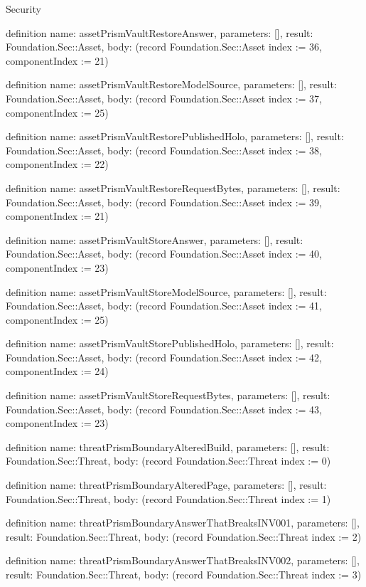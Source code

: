 \begin{lexlean}{Security}
\begin{semanticmodule}
definition{
  name: assetPrismVaultRestoreAnswer,
  parameters: [],
  result: Foundation.Sec::Asset,
  body: (record Foundation.Sec::Asset {index := 36, componentIndex := 21})
}

definition{
  name: assetPrismVaultRestoreModelSource,
  parameters: [],
  result: Foundation.Sec::Asset,
  body: (record Foundation.Sec::Asset {index := 37, componentIndex := 25})
}

definition{
  name: assetPrismVaultRestorePublishedHolo,
  parameters: [],
  result: Foundation.Sec::Asset,
  body: (record Foundation.Sec::Asset {index := 38, componentIndex := 22})
}

definition{
  name: assetPrismVaultRestoreRequestBytes,
  parameters: [],
  result: Foundation.Sec::Asset,
  body: (record Foundation.Sec::Asset {index := 39, componentIndex := 21})
}

definition{
  name: assetPrismVaultStoreAnswer,
  parameters: [],
  result: Foundation.Sec::Asset,
  body: (record Foundation.Sec::Asset {index := 40, componentIndex := 23})
}

definition{
  name: assetPrismVaultStoreModelSource,
  parameters: [],
  result: Foundation.Sec::Asset,
  body: (record Foundation.Sec::Asset {index := 41, componentIndex := 25})
}

definition{
  name: assetPrismVaultStorePublishedHolo,
  parameters: [],
  result: Foundation.Sec::Asset,
  body: (record Foundation.Sec::Asset {index := 42, componentIndex := 24})
}

definition{
  name: assetPrismVaultStoreRequestBytes,
  parameters: [],
  result: Foundation.Sec::Asset,
  body: (record Foundation.Sec::Asset {index := 43, componentIndex := 23})
}

definition{
  name: threatPrismBoundaryAlteredBuild,
  parameters: [],
  result: Foundation.Sec::Threat,
  body: (record Foundation.Sec::Threat {index := 0})
}

definition{
  name: threatPrismBoundaryAlteredPage,
  parameters: [],
  result: Foundation.Sec::Threat,
  body: (record Foundation.Sec::Threat {index := 1})
}

definition{
  name: threatPrismBoundaryAnswerThatBreaksINV001,
  parameters: [],
  result: Foundation.Sec::Threat,
  body: (record Foundation.Sec::Threat {index := 2})
}

definition{
  name: threatPrismBoundaryAnswerThatBreaksINV002,
  parameters: [],
  result: Foundation.Sec::Threat,
  body: (record Foundation.Sec::Threat {index := 3})
}


\end{semanticmodule}
\end{lexlean}
